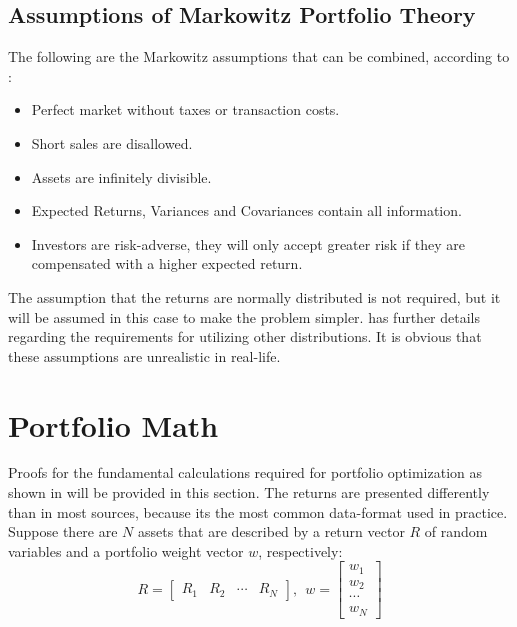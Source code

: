 \documentclass[
  oneside]{book}
\providecommand{\tightlist}{%
  \setlength{\itemsep}{0pt}\setlength{\parskip}{0pt}}
\begin{document}
\hypertarget{assumptions-of-markowitz-portfolio-theory}{%
\subsection{Assumptions of Markowitz Portfolio Theory}\label{assumptions-of-markowitz-portfolio-theory}}

The following are the Markowitz assumptions that can be combined, according to \citep{Mari2005}:

\begin{itemize}
\tightlist
\item
  Perfect market without taxes or transaction costs.
\item
  Short sales are disallowed.
\item
  Assets are infinitely divisible.
\item
  Expected Returns, Variances and Covariances contain all information.
\item
  Investors are risk-adverse, they will only accept greater risk if they
  are compensated with a higher expected return.
\end{itemize}

The assumption that the returns are normally distributed is not required, but it will be assumed in this case to make the problem simpler. \citep{Mari2005} has further details regarding the requirements for utilizing other distributions. It is obvious that these assumptions are unrealistic in real-life.

\hypertarget{portfolio-math}{%
\section{Portfolio Math}\label{portfolio-math}}

Proofs for the fundamental calculations required for portfolio optimization as shown in \citep{Eric2021} will be provided in this section. The returns are presented differently than in most sources, because its the most common data-format used in practice. Suppose there are \(N\) assets that are described by a return vector \(R\) of random variables and a portfolio weight vector \(w\), respectively:
\[
  R = 
  \begin{bmatrix}
    R_{1} & R_{2} & \cdots & R_{N}  
 \end{bmatrix}
 , \ \ 
 w = 
  \begin{bmatrix}
    w_{1} \\ 
    w_{2} \\
    \cdots \\
    w_{N}  
 \end{bmatrix}
\]
\end{document}
